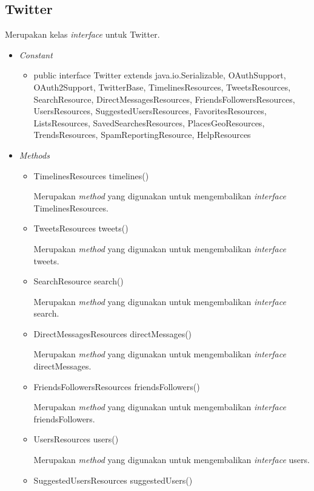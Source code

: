 \subsection{Twitter}
	Merupakan kelas \textit{interface} untuk Twitter.
	\begin{itemize}
		\item \textit{Constant}
		
		\begin{itemize}
			\item public interface Twitter
extends java.io.Serializable, OAuthSupport, OAuth2Support, TwitterBase, TimelinesResources, TweetsResources, SearchResource, DirectMessagesResources, FriendsFollowersResources, UsersResources, SuggestedUsersResources, FavoritesResources, ListsResources, SavedSearchesResources, PlacesGeoResources, TrendsResources, SpamReportingResource, HelpResources
			
		\end{itemize}
		
		\item \textit{Methods}
		
		\begin{itemize}
			\item TimelinesResources timelines()
			
			Merupakan \textit{method} yang digunakan untuk mengembalikan \textit{interface} TimelinesResources.
			\item TweetsResources tweets()
			
			Merupakan \textit{method} yang digunakan untuk mengembalikan \textit{interface} tweets.
			\item SearchResource search()
			
			Merupakan \textit{method} yang digunakan untuk mengembalikan \textit{interface} search.
			\item DirectMessagesResources directMessages()
			
			Merupakan \textit{method} yang digunakan untuk mengembalikan \textit{interface} directMessages.
			\item FriendsFollowersResources friendsFollowers()
			
			Merupakan \textit{method} yang digunakan untuk mengembalikan \textit{interface} friendsFollowers.
			\item UsersResources users()
			
			Merupakan \textit{method} yang digunakan untuk mengembalikan \textit{interface} users.
			\item SuggestedUsersResources suggestedUsers()
			

\end{itemize}
\end{itemize}
